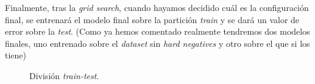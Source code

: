 Finalmente, tras la \textit{grid search}, cuando hayamos decidido cuál es la configuración final, se entrenará el modelo final sobre la partición \textit{train} y se dará un valor de error sobre la \textit{test}. (Como ya hemos comentado realmente tendremos dos modelos finales, uno entrenado sobre el \textit{dataset} sin \textit{hard negatives} y otro sobre el que si los tiene)

\begin{figure}[H]
\centering
    \caption{División \textit{train-test}.} 
\end{figure}

